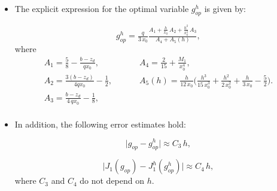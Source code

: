 \documentclass[axioms,article,submit,moreauthors]{Definitions/mdpi}
\begin{document}
    
   \begin{Lemma}\label{lema:goph} $ $
    
    \begin{itemize}
     \item[(a)] The explicit expression for the optimal variable ${g^h_{op}}$ is given by: 
     
    \begin{equation}\label{ec 3.4}
{g^h_{op}} = \tfrac{q}{3\,x_0} \tfrac{A_1 + \tfrac{h}{x_0}\,A_2 + \tfrac{h^2}{x_0^2}\, A_3}{A_4 + A_5(h)},
    \end{equation}
      where
\begin{equation}\label{Ai}
\begin{array}{ll}
A_1=\tfrac{5}{8} - \tfrac{b- z_d}{qx_0},\qquad \qquad & A_4 = \tfrac{2}{15} + \tfrac{M_1}{x_0^4},\\[0.15cm]
 A_2=\tfrac{3 (b-z_d)}{4 q x_0}  -\tfrac{1}{2}, & A_5(h) =  \tfrac{h}{12\,x_0} \Big( \tfrac{h^3}{15\, x_0^3} + \tfrac{h^2}{2 \, x_0^2} + \tfrac{h}{3\,x_0} - \tfrac{5}{2} \Big).\\[0.15cm]
  A_3=  \tfrac{b-z_d}{4\,qx_0} - \tfrac{1}{8}, \\ 
\end{array}
\end{equation}
      
     \item[(b)]In addition, the following error estimates hold:

  \begin{equation}\label{ec 3.5}
    				      \lvert g_{op} - {g^h_{op}}\rvert \approx C_3 \, h ,
    				  \end{equation}
    
\begin{equation}\label{ec 3.6}
    				     \Big \lvert J_1(g_{op}) - {J^h_{1}(g^h_{op})} \Big \rvert \approx C_4 \, h ,
    				\end{equation}
    where $C_3$  and $C_4$ do not depend on $h$.
   
    \end{itemize}
    \end{Lemma}
   
\end{document}
